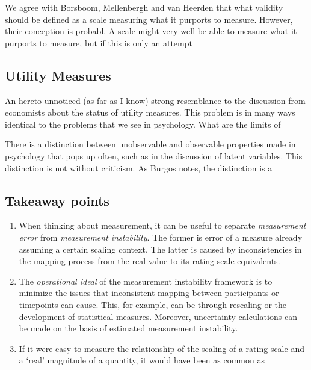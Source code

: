 \documentclass[utf8]{FrontiersinVancouver}
\begin{document}
We agree with Borsboom, Mellenbergh and van Heerden that what validity should be defined as a scale measuring what it purports to measure. However, their conception is probabl. A scale might very well be able to measure what it purports to measure, but if this is only an attempt 

\subsection{Utility Measures}
An hereto unnoticed (as far as I know) strong resemblance to the discussion from economists about the status of utility measures. This problem is in many ways  identical to the problems that we see in psychology. What are the limits of 

There is a distinction between unobservable and observable properties made in psychology that pops up often, such as in the discussion of latent variables. This distinction is not without criticism. As Burgos notes, the distinction is a \citep{burgosRealProblemHypothetical2021}

\subsection{Takeaway points}
\begin{enumerate}
    \item{When thinking about measurement, it can be useful to separate \textit{measurement error} from \textit{measurement instability}. The former is error of a measure already assuming a certain scaling context. The latter is caused by inconsistencies in the mapping process from the real value to its rating scale equivalents.}
    \item{The \textit{operational ideal} of the measurement instability framework is to minimize the issues that inconsistent mapping between participants or timepoints can cause. This, for example, can be through rescaling or the development of statistical measures. Moreover, uncertainty calculations can be made on the basis of estimated measurement instability.}
    \item{If it were easy to measure the relationship of the scaling of a rating scale and a `real' magnitude of a quantity, it would have been as common as }
\end{enumerate}

\end{document}

